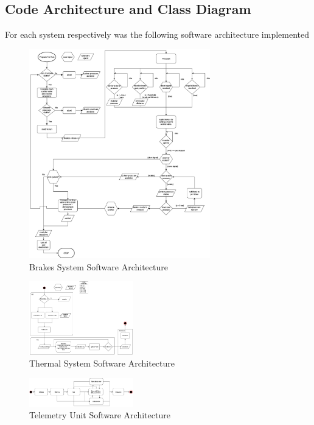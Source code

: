 \subsection{Code Architecture and Class Diagram}
For each system respectively was the following software architecture implemented
\begin{figure}[H]
        \centering
       \includegraphics[width=0.7\textwidth]{texfiles/elec/eimg/brakesoftware_ext}
        \caption{Brakes System Software Architecture}
        \label{fig:Brakes System Software Architecture}
    \end{figure}

\begin{figure}[H]
        \centering
       \includegraphics[width=0.4\textwidth]{texfiles/elec/eimg/thermalsystemsflowchartsoftware}
        \caption{Thermal System Software Architecture}
        \label{fig:Thermal System Software Architecture}
    \end{figure}

\begin{figure}[H]
        \centering
       \includegraphics[width=0.4\textwidth]{texfiles/elec/eimg/telemetrystate.png}
        \caption{Telemetry Unit Software Architecture}
        \label{fig:Telemetry Unit Software Architecture}
    \end{figure}

